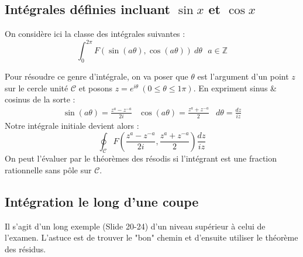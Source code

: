 	\subsection{Intégrales définies incluant $\sin x$ et $\cos x$}
	On considère ici la classe des intégrales suivantes :
	\begin{equation}
	\int_0^{2\pi} F(\sin(a\theta),\cos(a\theta))\ d\theta\ \ \ a \in \mathbb{Z}
	\end{equation}
	
	Pour résoudre ce genre d'intégrale, on va poser que $\theta$ est l'argument d'un 
	point $z$ sur le cercle unité $\mathcal{C}$ et posons $z=e^{i\theta}\ (0\leq \theta
	\leq 1\pi)$. 
	En expriment sinus \& cosinus de la sorte :
	\begin{equation}
	\begin{array}{ccc}
	\sin(a\theta) = \frac{z^a-z^{-a}}{2i} & \cos(a\theta) = \frac{z^a+z^{-a}}{2} & d\theta
	= \frac{dz}{iz}
	\end{array}
	\end{equation}
	Notre intégrale initiale devient alors :
	\begin{equation}
	\oint_\mathcal{C}F\left(\frac{z^a-z^{-a}}{2i}, \frac{z^a+z^{-a}}{2} \right)\frac{dz}
	{iz}
	\end{equation}
	On peut l'évaluer par le théorèmes des résodis si l'intégrant est une fraction 
	rationnelle sans pôle sur $\mathcal{C}$.
	
	\subsection{Intégration le long d'une coupe}
	Il s'agit d'un long exemple (Slide 20-24) d'un niveau supérieur à celui de l'examen.
	L'astuce est de trouver le "bon" chemin et d'ensuite utiliser le théorème des 
	résidus.


